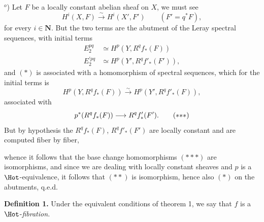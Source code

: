 $^o$) Let $F$ be a locally constant abelian sheaf on $X$, we must see 
\[
H^i(X,F) \xrightarrow{\ \sim\ } H^i(X', F') \qquad (F' = q^*F), \tag*{$(*)$}
\]
for every $i \in \mathbf{N}$. But the two terms are the abutment of the Leray spectral sequences, with initial terms
\[
\begin{aligned}
E_2^{pq} &\simeq H^p(Y, R^q f_*(F)) \\
E^{\prime pq}_2 &\simeq H^p(Y', R^q f'_*(F')),
\end{aligned}
\]
and $(*)$ is associated with a homomorphism of spectral sequences, which for the initial terms is
\[
H^p(Y, R^q f_*(F)) \xrightarrow{\sim} H^p(Y', R^q f'_*(F)), \tag*{$(**)$} %
\]
associated with
\[
p^*(R^q f_*(F)) \longrightarrow R^q f'_*(F'). \tag*{$(*{*}*)$}
\]
But by hypothesis the $R^q f_*(F)$, $R^q f'_*(F')$ are locally constant and are computed fiber by fiber,


\noindent whence it follows that the base change homomorphisms $(*{*}*)$ are isomorphisms, and since we are dealing with locally constant sheaves and $p$ is a $\Hot$-equivalence, it follows that $(**)$ is isomorphism, hence also $(*)$ on the abutments, q.e.d.

\noindent\textbf{Definition 1.} Under the equivalent conditions of theorem 1, we say that $f$ is a $\Hot$-\textit{fibration.}